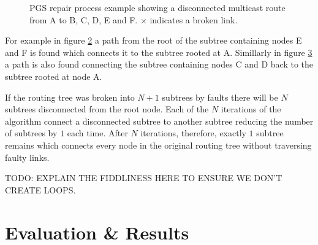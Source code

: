 			\begin{figure}
				\center
				\begin{subfigure}{0.32\linewidth}
					\hspace*{-1.5em}
					
					\caption{}
					\label{fig:pgs-repair-colouring}
				\end{subfigure}
				\begin{subfigure}{0.32\linewidth}
					\hspace*{-1.5em}
					
					\caption{}
					\label{fig:pgs-repair-colouring-fix1}
				\end{subfigure}
				\begin{subfigure}{0.32\linewidth}
					\hspace*{-1.5em}
					
					\caption{}
					\label{fig:pgs-repair-colouring-fix2}
				\end{subfigure}
				
				\caption{PGS repair process example showing a disconnected multicast
				route from A to B, C, D, E and F. $\times$ indicates a broken link.}
				\label{fig:pgs-repair-colouring-steps}
			\end{figure}
			
			For example in figure \ref{fig:pgs-repair-colouring-fix1} a path from the
			root of the subtree containing nodes E and F is found which connects it
			to the subtree rooted at A. Simillarly in figure
			\ref{fig:pgs-repair-colouring-fix2} a path is also found connecting the
			subtree containing nodes C and D back to the subtree rooted at node A.
			
			If the routing tree was broken into $N+1$ subtrees by faults there will
			be $N$ subtrees disconnected from the root node. Each of the $N$
			iterations of the algorithm connect a disconnected subtree to another
			subtree reducing the number of subtrees by $1$ each time. After $N$
			iterations, therefore, exactly $1$ subtree remains which connects every
			node in the original routing tree without traversing faulty links.
			
			TODO: EXPLAIN THE FIDDLINESS HERE TO ENSURE WE DON'T CREATE LOOPS.
		
	\section{Evaluation \& Results}
		
